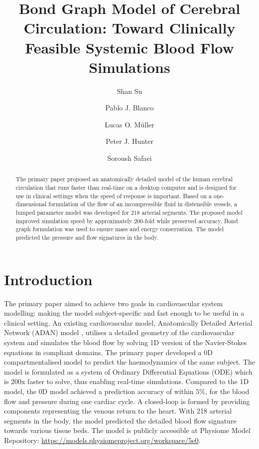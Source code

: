 \documentclass[fleqn,10pt]{physiome}
\title{Bond Graph Model of Cerebral Circulation: Toward Clinically Feasible Systemic Blood Flow Simulations}
\author[1]{Shan Su}
\author[2]{Pablo J. Blanco}
\author[3]{Lucas O. M\"{u}ller}
\author[1]{Peter J. Hunter}
\author[1][soroush.safaei @auckland.ac.nz]{Soroush Safaei}
\affil[1]{Auckland Bioengineering Institute, University of Auckland, New Zealand}
\affil[2]{National Laboratory for Scientific Computing, Petrópolis, Brazil}
\affil[3]{Department of Mathematics, University of Trento, Italy}
\begin{document}
\maketitle

\begin{abstract}
The primary paper \citet{safaei2018} proposed an anatomically detailed model of the human cerebral circulation that runs faster than real-time on a desktop computer and is designed for use in clinical settings when the speed of response is important. Based on a one-dimensional formulation of the flow of an incompressible fluid in distensible vessels, a lumped parameter model was developed for 218 arterial segments. The proposed model improved simulation speed by approximately 200-fold while preserved accuracy. Bond graph formulation was used to ensure mass and energy conservation. The model predicted the pressure and flow signatures in the body.
\end{abstract}



\section{Introduction}
The primary paper \citet{safaei2018} aimed to achieve two goals in cardiovascular system modelling: making the model subject-specific and fast enough to be useful in a clinical setting. An existing cardiovascular model, Anatomically Detailed Arterial Network (ADAN) model \citet{blanco2015}, utilises a detailed geometry of the cardiovascular system and simulates the blood flow by solving 1D version of the Navier-Stokes equations in compliant domains. The primary paper developed a 0D compartmentalised model to predict the haemodynamics of the same subject. The model is formulated as a system of Ordinary Differential Equations (ODE) which is 200x faster to solve, thus enabling real-time simulations. Compared to the 1D model, the 0D model achieved a prediction accuracy of within $5$\%, for the blood flow and pressure during one cardiac cycle. A closed-loop is formed by providing components representing the venous return to the heart. With 218 arterial segments in the body, the model predicted the detailed blood flow signature towards various tissue beds. The model is publicly accessible at Physiome Model Repository: \url{https://models.physiomeproject.org/workspace/5e0}.
\end{document}
